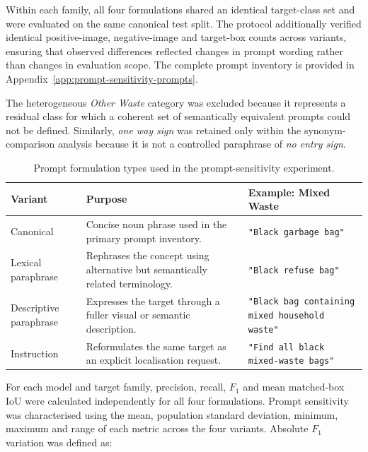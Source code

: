 Within each family, all four formulations shared an identical target-class set and were evaluated on the same canonical test split. The protocol additionally verified identical positive-image, negative-image and target-box counts across variants, ensuring that observed differences reflected changes in prompt wording rather than changes in evaluation scope. The complete prompt inventory is provided in Appendix~\ref{app:prompt-sensitivity-prompts}.

The heterogeneous \emph{Other Waste} category was excluded because it represents a residual class for which a coherent set of semantically equivalent prompts could not be defined. Similarly, \emph{one way sign} was retained only within the synonym-comparison analysis because it is not a controlled paraphrase of \emph{no entry sign}.

\begin{table}[H]
\centering
\small
\caption{Prompt formulation types used in the prompt-sensitivity experiment.}
\label{tab:prompt-sensitivity-types}
\renewcommand{\arraystretch}{1.25}
\begin{tabularx}{\textwidth}{
    @{}
    >{\raggedright\arraybackslash}p{3.2cm}
    >{\raggedright\arraybackslash}X
    >{\raggedright\arraybackslash}p{5.0cm}
    @{}
}
\toprule
\textbf{Variant} & \textbf{Purpose} & \textbf{Example: Mixed Waste} \\
\midrule

Canonical
& Concise noun phrase used in the primary prompt inventory.
& \texttt{"Black garbage bag"} \\

Lexical paraphrase
& Rephrases the concept using alternative but semantically related terminology.
& \texttt{"Black refuse bag"} \\

Descriptive paraphrase
& Expresses the target through a fuller visual or semantic description.
& \texttt{"Black bag containing mixed household waste"} \\

Instruction
& Reformulates the same target as an explicit localisation request.
& \texttt{"Find all black mixed-waste bags"} \\

\bottomrule
\end{tabularx}
\end{table}

\noindent For each model and target family, precision, recall, \(F_1\) and mean matched-box \gls{IoU} were calculated independently for all four formulations. Prompt sensitivity was characterised using the mean, population standard deviation, minimum, maximum and range of each metric across the four variants. Absolute \(F_1\) variation was defined as:

